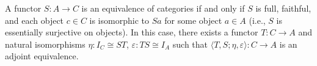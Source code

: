 A functor $S: A \to C$ is an equivalence of categories if and only if $S$ is full, faithful, and each object $c \in C$ is isomorphic to $Sa$ for some object $a \in A$ (i.e., $S$ is essentially surjective on objects). In this case, there exists a functor $T: C \to A$ and natural isomorphisms $\eta: I_C \cong ST$, $\varepsilon: TS \cong I_A$ such that $\langle T, S; \eta, \varepsilon \rangle: C \to A$ is an adjoint equivalence.
